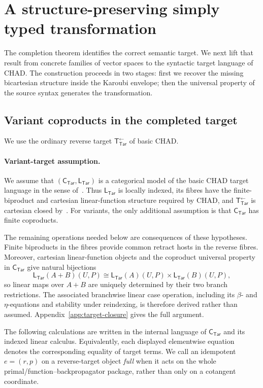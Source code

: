 \documentclass[runningheads,envcountsame]{llncs}
\newcommand{\Tar}{\mathsf{Tar}}
\newcommand{\CTar}{\mathsf C_{\Tar}}
\newcommand{\LTar}{\mathsf L_{\Tar}}
\newcommand{\TotTar}{\mathsf T_{\Tar}^{\leftarrow}}
\begin{document}
\section{A structure-preserving simply typed transformation}
\label{sec:transformation}

The completion theorem identifies the correct semantic target. We next lift that result from concrete families of vector spaces to the syntactic target language of CHAD\@. The construction proceeds in two stages: first we recover the missing bicartesian structure inside the Karoubi envelope; then the universal property of the source syntax generates the transformation.

\subsection{Variant coproducts in the completed target}

We use the ordinary reverse target $\TotTar$ of basic CHAD.

\paragraph{Variant-target assumption.}
We assume that $(\CTar,\LTar)$ is a categorical model of the basic CHAD
target language in the sense of~\cite[Definition~5.5]{VakarSmeding2022}.
Thus $\LTar$ is locally indexed, its fibres have the finite-biproduct and
cartesian linear-function structure required by CHAD, and $\TotTar$ is
cartesian closed by~\cite[Theorem~6.2]{VakarSmeding2022}. For variants, the
only additional assumption is that $\CTar$ has finite coproducts.

The remaining operations needed below are consequences of these hypotheses.
Finite biproducts in the fibres provide common retract hosts in the reverse
fibres. Moreover, cartesian linear-function objects and the coproduct universal
property in $\CTar$ give natural bijections
$$
\LTar(A+B)(U,P)
\cong
\LTar(A)(U,P)\times\LTar(B)(U,P),
$$
so linear maps over $A+B$ are uniquely determined by their two branch
restrictions. The associated branchwise linear case operation, including its
$\beta$- and $\eta$-equations and stability under reindexing, is therefore
derived rather than assumed. Appendix~\ref{app:target-closure} gives the full
argument.


The following calculations are written in the internal language of $\CTar$ and its indexed linear calculus. Equivalently, each displayed elementwise equation denotes the corresponding equality of target terms. We call an idempotent $e=(r,p)$ on a reverse-target object \emph{full} when it acts on the whole primal/function--backpropagator package, rather than only on a cotangent coordinate.
\end{document}
